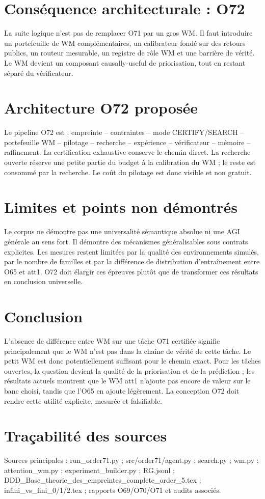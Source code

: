 \documentclass[11pt,a4paper]{article}
\begin{document}
\section{Conséquence architecturale : O72}
La suite logique n'est pas de remplacer O71 par un gros WM. Il faut introduire un portefeuille de WM complémentaires, un calibrateur fondé sur des retours publics, un routeur mesurable, un registre de rôle WM et une barrière de vérité. Le WM devient un composant causally-useful de priorisation, tout en restant séparé du vérificateur.
\section{Architecture O72 proposée}
Le pipeline O72 est : empreinte -- contraintes -- mode CERTIFY/SEARCH -- portefeuille WM -- pilotage -- recherche -- expérience -- vérificateur -- mémoire -- raffinement.
La certification exhaustive conserve le chemin direct. La recherche ouverte réserve une petite partie du budget à la calibration du WM ; le reste est consommé par la recherche. Le coût du pilotage est donc visible et non gratuit.
\section{Limites et points non démontrés}
Le corpus ne démontre pas une universalité sémantique absolue ni une AGI générale au sens fort. Il démontre des mécanismes généralisables sous contrats explicites. Les mesures restent limitées par la qualité des environnements simulés, par le nombre de familles et par la différence de distribution d'entraînement entre O65 et att1. O72 doit élargir ces épreuves plutôt que de transformer ces résultats en conclusion universelle.
\section{Conclusion}
L'absence de différence entre WM sur une tâche O71 certifiée signifie principalement que le WM n'est pas dans la chaîne de vérité de cette tâche. Le petit WM est donc potentiellement suffisant pour le chemin exact. Pour les tâches ouvertes, la question devient la qualité de la priorisation et de la prédiction ; les résultats actuels montrent que le WM att1 n'ajoute pas encore de valeur sur le banc choisi, tandis que l'O65 en ajoute légèrement. La conception O72 doit rendre cette utilité explicite, mesurée et falsifiable.
\appendix
\section{Traçabilité des sources}
Sources principales : run\_order71.py ; src/order71/agent.py ; search.py ; wm.py ; attention\_wm.py ; experiment\_builder.py ; RG.jsonl ; DDD\_Base\_theorie\_des\_empreintes\_complete\_order\_5.tex ; infini\_vs\_fini\_0/1/2.tex ; rapports O69/O70/O71 et audits associés.
\end{document}
